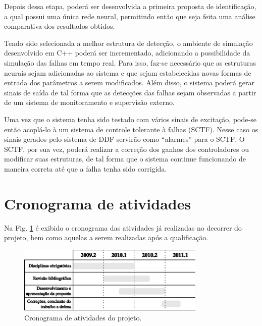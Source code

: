 Depois dessa etapa, poderá ser desenvolvida a primeira proposta de
identificação, a qual possui uma única rede neural, permitindo então que seja
feita uma análise comparativa dos resultados obtidos.

Tendo sido selecionada a melhor estrutura de detecção, o ambiente de simulação
desenvolvido em C++ poderá ser incrementado, adicionando a possibilidade da
simulação das falhas em tempo real. Para isso, faz-se necessário que as
estruturas neurais sejam adicionadas ao sistema e que sejam estabelecidas novas
formas de entrada dos parâmetros a serem modificados. Além disso, o sistema
poderá gerar sinais de saída de tal forma que as detecções das falhas sejam
observadas a partir de um sistema de monitoramento e supervisão externo. 

Uma vez que o sistema tenha sido testado com vários sinais de excitação, pode-se
então acoplá-lo à um sistema de controle tolerante à falhas (SCTF). Nesse caso
os sinais gerados pelo sistema de DDF servirão como ``alarmes'' para o SCTF. O
SCTF, por sua vez, poderá realizar a correção dos ganhos dos controladores ou
modificar suas estruturas, de tal forma que o sistema continue funcionando de
maneira correta até que a falha tenha sido corrigida.


\section{Cronograma de atividades}
Na Fig. \ref{fig:cronograma} é exibido o cronograma das atividades já realizadas
no decorrer do projeto, bem como aquelas a serem realizadas após a qualificação.

\begin{figure}[htb]
\centering
    \includegraphics[width=0.8\textwidth]{imgs/conclusoes/eps/cronograma}
    \caption{Cronograma de atividades do projeto.}
    \label{fig:cronograma}
\end{figure}

